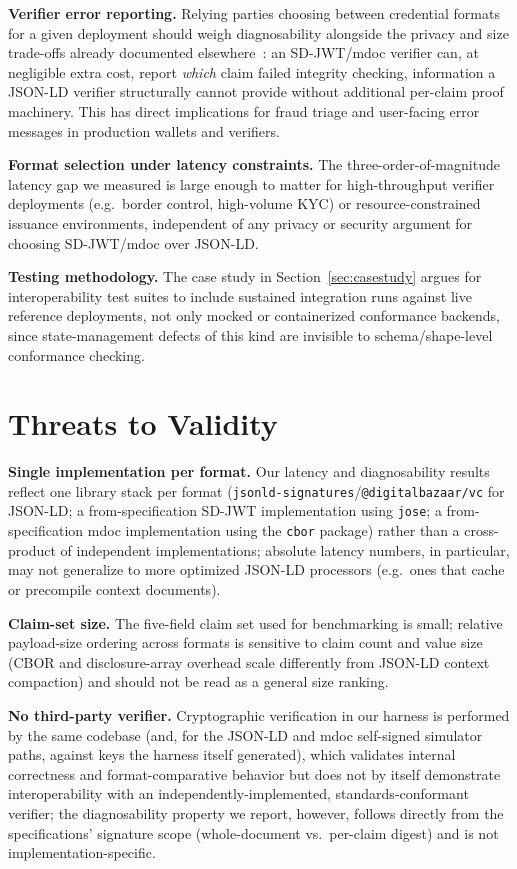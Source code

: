 \documentclass[conference]{IEEEtran}
\begin{document}
\textbf{Verifier error reporting.} Relying parties choosing between credential formats for a given deployment should weigh diagnosability alongside the privacy and size trade-offs already documented elsewhere~\cite{mazzocca-survey, buldini-csdjwt}: an SD-JWT/mdoc verifier can, at negligible extra cost, report \emph{which} claim failed integrity checking, information a JSON-LD verifier structurally cannot provide without additional per-claim proof machinery. This has direct implications for fraud triage and user-facing error messages in production wallets and verifiers.

\textbf{Format selection under latency constraints.} The three-order-of-magnitude latency gap we measured is large enough to matter for high-throughput verifier deployments (e.g.\ border control, high-volume KYC) or resource-constrained issuance environments, independent of any privacy or security argument for choosing SD-JWT/mdoc over JSON-LD.

\textbf{Testing methodology.} The case study in Section~\ref{sec:casestudy} argues for interoperability test suites to include sustained integration runs against live reference deployments, not only mocked or containerized conformance backends, since state-management defects of this kind are invisible to schema/shape-level conformance checking.

\section{Threats to Validity}
\label{sec:threats}

\textbf{Single implementation per format.} Our latency and diagnosability results reflect one library stack per format (\texttt{jsonld-signatures}/\texttt{@digitalbazaar/vc} for JSON-LD; a from-specification SD-JWT implementation using \texttt{jose}; a from-specification mdoc implementation using the \texttt{cbor} package) rather than a cross-product of independent implementations; absolute latency numbers, in particular, may not generalize to more optimized JSON-LD processors (e.g.\ ones that cache or precompile context documents).

\textbf{Claim-set size.} The five-field claim set used for benchmarking is small; relative payload-size ordering across formats is sensitive to claim count and value size (CBOR and disclosure-array overhead scale differently from JSON-LD context compaction) and should not be read as a general size ranking.

\textbf{No third-party verifier.} Cryptographic verification in our harness is performed by the same codebase (and, for the JSON-LD and mdoc self-signed simulator paths, against keys the harness itself generated), which validates internal correctness and format-comparative behavior but does not by itself demonstrate interoperability with an independently-implemented, standards-conformant verifier; the diagnosability property we report, however, follows directly from the specifications' signature scope (whole-document vs.\ per-claim digest) and is not implementation-specific.
\end{document}

